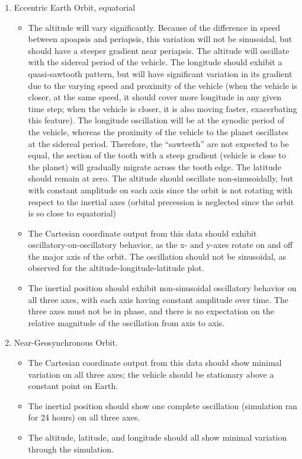 \begin{description}
\begin{enumerate}
\item {Eccentric Earth Orbit, equatorial}
\begin{itemize}
\item{}The altitude will vary significantly.  Because of the difference in speed between apoapsis and periapsis, this variation will not be sinusoidal, but should have a steeper gradient near periapsis.  The altitude will oscillate with the sidereal period of the vehicle.
The longitude should exhibit a quasi-sawtooth pattern, but will have significant variation in its gradient due to the varying speed and proximity of the vehicle (when the vehicle is closer, at the same speed, it should cover more longitude in any given time step; when the vehicle is closer, it is also moving faster, exacerbating this feature).  The longitude oscillation will be at the synodic period of the vehicle, whereas the proximity of the vehicle to the planet oscillates at the sidereal period.  Therefore, the ``sawteeth'' are not expected to be equal, the section of the tooth with a steep gradient (vehicle is close to the planet) will gradually migrate across the tooth edge. 
The latitude should remain at zero.  The altitude should oscillate non-sinusoidally, but with constant amplitude on each axis since the orbit is not rotating with respect to the inertial axes (orbital precession is neglected since the orbit is so close to equatorial) 
\item{}The Cartesian coordinate output from this data should exhibit oscillatory-on-oscillatory behavior, as the x- and y-axes rotate on and off the major axis of the orbit.  The oscillation should not be sinusoidal, as observed for the altitude-longitude-latitude plot.
\item{}The inertial position should exhibit non-sinusoidal oscillatory behavior on all three axes, with each axis having constant amplitude over time.  The three axes must not be in phase, and there is no expectation on the relative magnitude of the oscillation from axis to axis.
\end{itemize}

\item {Near-Geosynchronous Orbit.}
\begin{itemize}
\item{}The Cartesian coordinate output from this data should show minimal variation on all three axes; the vehicle should be stationary above a constant point on Earth.
\item{}The inertial position should show one complete oscillation (simulation ran for 24 hours) on all three axes.
\item{}The altitude, latitude, and longitude should all show minimal variation through the simulation.
\end{itemize}


\end{enumerate}
\end{description}
